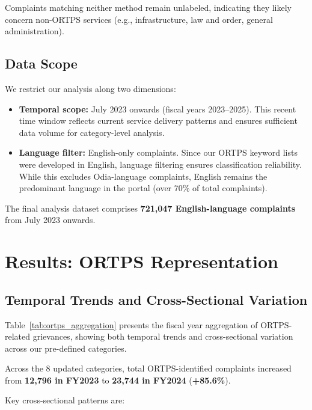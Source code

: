 \documentclass[11pt,a4paper]{article}
\begin{document}
Complaints matching neither method remain unlabeled, indicating they likely concern non-ORTPS services (e.g., infrastructure, law and order, general administration).

\subsection{Data Scope}

We restrict our analysis along two dimensions:

\begin{itemize}
    \item \textbf{Temporal scope:} July 2023 onwards (fiscal years 2023--2025). This recent time window reflects current service delivery patterns and ensures sufficient data volume for category-level analysis.

    \item \textbf{Language filter:} English-only complaints. Since our ORTPS keyword lists were developed in English, language filtering ensures classification reliability. While this excludes Odia-language complaints, English remains the predominant language in the portal (over 70\% of total complaints).
\end{itemize}

The final analysis dataset comprises \textbf{721,047 English-language complaints} from July 2023 onwards.

\section{Results: ORTPS Representation}





\subsection{Temporal Trends and Cross-Sectional Variation}

Table~\ref{tab:ortps_aggregation} presents the fiscal year aggregation of ORTPS-related grievances, showing both temporal trends and cross-sectional variation across our pre-defined categories.

Across the 8 updated categories, total ORTPS-identified complaints increased from \textbf{12,796 in FY2023} to \textbf{23,744 in FY2024} (\textbf{+85.6\%}).

Key cross-sectional patterns are:
\end{document}

